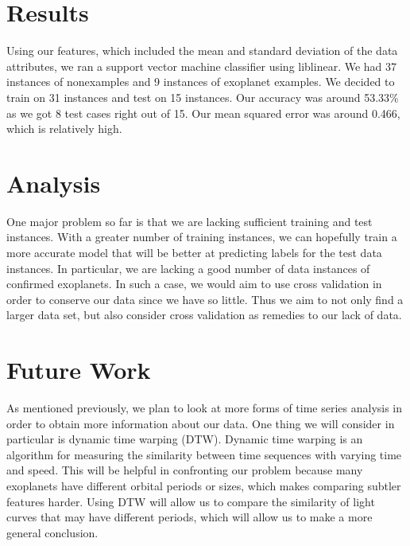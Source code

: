 \documentclass{amsart}
\begin{document}
\section{Results}
Using our features, which included the mean and standard deviation of the data attributes, we ran a support vector machine classifier using liblinear. We had 37 instances of nonexamples and 9 instances of exoplanet examples. We decided to train on 31 instances and test on 15 instances. Our accuracy was around 53.33\% as we got 8 test cases right out of 15. Our mean squared error was around 0.466, which is relatively high. 

\section{Analysis}
One major problem so far is that we are lacking sufficient training and test instances. With a greater number of training instances, we can hopefully train a more accurate model that will be better at predicting labels for the test data instances. In particular, we are lacking a good number of data instances of confirmed exoplanets. In such a case, we would aim to use cross validation in order to conserve our data since we have so little. Thus we aim to not only find a larger data set, but also consider cross validation as remedies to our lack of data.

\section{Future Work}
As mentioned previously, we plan to look at more forms of time series analysis in order to obtain more information about our data. One thing we will consider in particular is dynamic time warping (DTW). Dynamic time warping is an algorithm for measuring the similarity between time sequences with varying time and speed. This will be helpful in confronting our problem because many exoplanets have different orbital periods or sizes, which makes comparing subtler features harder. Using DTW will allow us to compare the similarity of light curves that may have different periods, which will allow us to make a more general conclusion.
\end{document}

